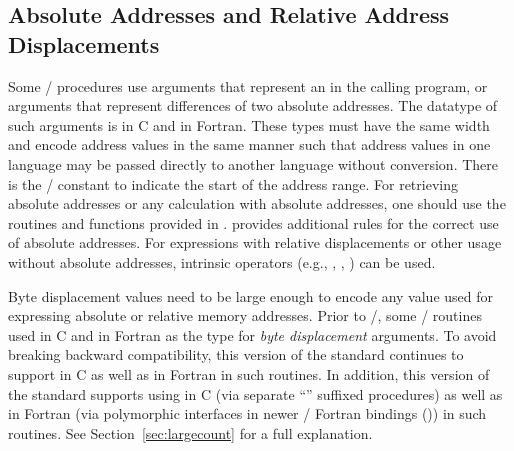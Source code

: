 \subsection{Absolute Addresses and Relative Address Displacements}
\label{subsec:displacement}

Some \MPI/ procedures use  arguments that represent an
 in the calling program,
or 
arguments that represent differences of two absolute addresses.
The datatype of such arguments
is  in C and\flushline %
 in Fortran.
These types must have the same width and encode
address values in the same manner such that address values in one
language may be passed directly to another language without
conversion.
There is the \mpi/ constant  to indicate
the start of the address range.
For retrieving absolute addresses or any calculation with absolute addresses,
one should use the routines and functions provided in .
 provides additional rules for the correct
use of absolute addresses. For expressions with relative displacements
or other usage without absolute addresses, intrinsic operators
(e.g., \code{+}, \code{-}, \code{*}) can be used.

\begin{rationale}
  Byte displacement values need to be large enough to encode any value used for expressing
  absolute or relative memory addresses.
  Prior to \MPIIVDOTO/, some \MPI/ routines used
   in C and  in Fortran
  as the type for \emph{byte displacement} arguments.
  To avoid breaking backward compatibility,
  this version of the standard continues to support
   in C as well as  in Fortran
  in such routines. In addition,
  this version of the standard supports using
   in C
  (via separate ``''%
  suffixed procedures)
  as well as
   in Fortran
  (via polymorphic interfaces in newer \MPI/ Fortran bindings
  ())
  in such routines.
  See Section~\ref{sec:largecount} for a full explanation.
\end{rationale}

